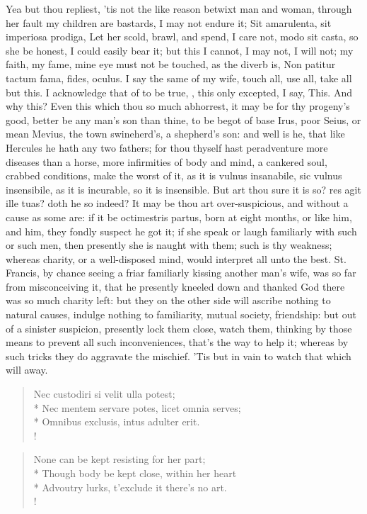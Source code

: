 Yea but thou repliest, 'tis not the like reason betwixt man and woman,
through her fault my children are bastards, I may not endure it;
Sit amarulenta, sit imperiosa prodiga, \etc{} Let her scold, brawl,
and spend, I care not, modo sit casta, so she be honest, I could easily
bear it; but this I cannot, I may not, I will not; my faith, my fame,
mine eye must not be touched, as the diverb is, Non patitur tactum
fama, fides, oculus. I say the same of my wife, touch all, use all,
take all but this. I acknowledge that of \Seneca to be true, , this only excepted, I say, This. And why
this? Even this which thou so much abhorrest, it may
be for thy progeny's good,  better be any man's son than thine,
to be begot of base Irus, poor Seius, or mean Mevius, the town
swineherd's, a shepherd's son: and well is he, that like Hercules he
hath any two fathers; for thou thyself hast peradventure more diseases
than a horse, more infirmities of body and mind, a cankered soul,
crabbed conditions, make the worst of it, as it is vulnus insanabile,
sic vulnus insensibile, as it is incurable, so it is insensible. But
art thou sure it is so? res agit ille tuas? doth he so indeed? It
may be thou art over-suspicious, and without a cause as some are: if it
be octimestris partus, born at eight months, or like him, and him, they
fondly suspect he got it; if she speak or laugh familiarly with such or
such men, then presently she is naught with them; such is thy weakness;
whereas charity, or a well-disposed mind, would interpret all unto the
best. St. Francis, by chance seeing a friar familiarly kissing another
man's wife, was so far from misconceiving it, that he presently kneeled
down and thanked God there was so much charity left: but they on the
other side will ascribe nothing to natural causes, indulge nothing to
familiarity, mutual society, friendship: but out of a sinister
suspicion, presently lock them close, watch them, thinking by those
means to prevent all such inconveniences, that's the way to help it;
whereas by such tricks they do aggravate the mischief. 'Tis but in vain
to watch that which will away.
%
\begin{latin}%
\begin{verse}%
Nec custodiri si velit ulla potest;\\*
Nec mentem servare potes, licet omnia serves;\\*
Omnibus exclusis, intus adulter erit.\\!
\end{verse}%
\end{latin}%
\translationrule%
\begin{verse}%
None can be kept resisting for her part;\\*
Though body be kept close, within her heart\\*
Advoutry lurks, t'exclude it there's no art.\\!
\end{verse}%
%

